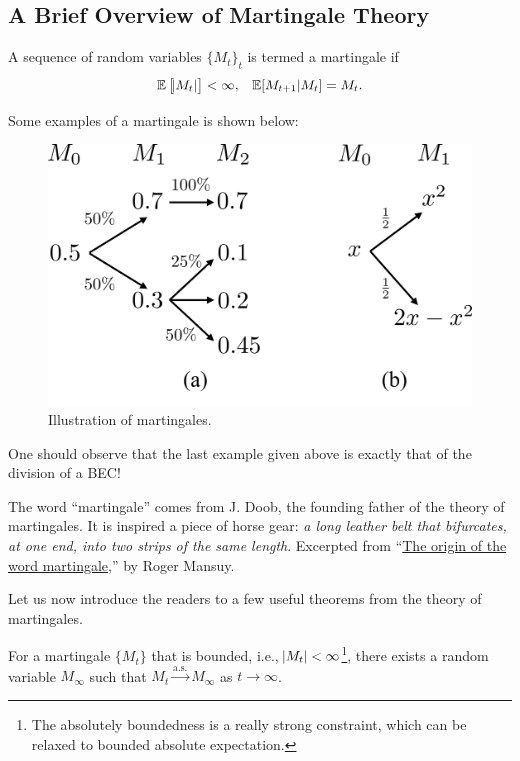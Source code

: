 \subsection{A Brief Overview of Martingale Theory}
\begin{definition}[Martingale]
    A sequence of random variables $\{M_t\}_t$ is termed a martingale if
    \begin{align}
        &\mathbb{E}\left[\abs{M_t}\right]<\infty,&\mathbb{E}[M_{t+1}\vert M_t] = M_t.
    \end{align}
\end{definition}

Some examples of a martingale is shown below:
\begin{figure}[H]
    \centering
    \includegraphics[width=0.5\linewidth]{figures/w3_martingale.png}
    \caption{Illustration of martingales.}
\end{figure}
One should observe that the last example given above is exactly that of the division of a BEC!

\begin{remark}
    The word ``martingale'' comes from J. Doob, the founding father of the theory of martingales. It is inspired a piece of horse gear: \textit{a long leather belt that bifurcates, at one end, into two strips of the same length}. Excerpted from ``\href{https://www.jehps.net/juin2009/Mansuy.pdf}{The origin of the word martingale},'' by Roger Mansuy.
\end{remark}

Let us now introduce the readers to a few useful theorems from the theory of martingales.
\begin{theorem}
    For a martingale $\{M_t\}$ that is bounded, i.e., $\abs{M_t}<\infty$\footnote{The absolutely boundedness is a really strong constraint, which can be relaxed to bounded absolute expectation.}, there exists a random variable $M_\infty$ such that $M_t\xrightarrow{\text{a.s.}} M_\infty$ as $t\rightarrow\infty$.
\end{theorem}

